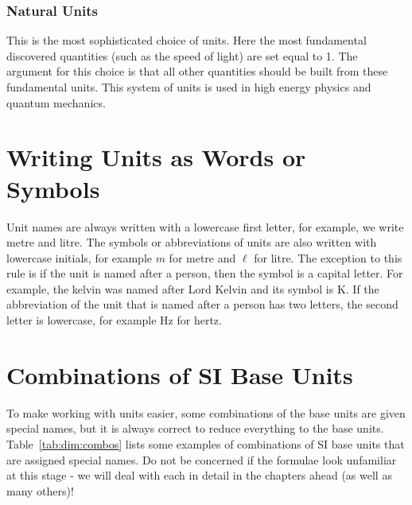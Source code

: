 \subsubsection{Natural Units}
This is the most sophisticated choice of units. Here the most
fundamental discovered quantities (such as the speed of light) are
set equal to 1. The argument for this choice is that all other
quantities should be built from these fundamental units. This
system of units is used in high energy physics and quantum
mechanics.

\section{Writing Units as Words or Symbols}
Unit names are always written with a lowercase first letter, for
example, we write metre and litre. The symbols or
abbreviations of units are also written with lowercase initials,
for example $m$ for metre and $\ell$ for litre. The exception to
this rule is if the unit is named after a person, then the
symbol is a capital letter. For example, the kelvin was named
after Lord Kelvin and its symbol is K. If the abbreviation of the unit that is named after a person has two letters, the second letter is lowercase, for example Hz for hertz.


\section{Combinations of SI Base Units}
To make working with units easier, some combinations of the base
units are given special names, but it is always correct to reduce
everything to the base units. Table~\ref{tab:dim:combos} lists
some examples of combinations of SI base units that are assigned
special names. Do not be concerned if the formulae look unfamiliar
at this stage - we will deal with each in detail in the chapters
ahead (as well as many others)!

